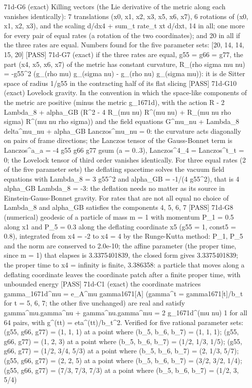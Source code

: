 \documentclass[
  10pt,
]{article}
\newenvironment{Shaded}{}{}
\newcommand{\NormalTok}[1]{#1}
\begin{document}
\begin{Shaded}
\begin{Highlighting}[]
\NormalTok{[PASS] 71d{-}G6  (exact) Killing vectors (the Lie derivative of the metric along each vanishes identically): 7 translations (x0, x1, x2, x3, x5, x6, x7), 6 rotations of (x0, x1, x2, x3), and the scaling d/dx4 + sum\_t rate\_t xt d/dxt, 14 in all; one more for every pair of equal rates (a rotation of the two coordinates); and 20 in all if the three rates are equal. Numbers found for the five parameter sets: [20, 14, 14, 15, 20]}
\NormalTok{[PASS] 71d{-}G7  (exact) if the three rates are equal, g55 = g66 = g77, the part (x4, x5, x6, x7) of the metric has constant curvature, R\_(rho sigma mu nu) = {-}g55\^{}2 (g\_(rho mu) g\_(sigma nu) {-} g\_(rho nu) g\_(sigma mu)): it is de Sitter space of radius 1/g55 in the contracting half of its flat slicing}
\NormalTok{[PASS] 71d{-}G10  (exact) Lovelock gravity. In the convention in which the space{-}like components of the metric are positive (minus the metric g\_1671d), with the action R {-} 2 Lambda\_8 + alpha\_GB (R\^{}2 {-} 4 R\_(mu nu) R\^{}(mu nu) + R\_(mu nu rho sigma) R\^{}(mu nu rho sigma)) and the field equations G\^{}mu\_nu + Lambda\_8 delta\^{}mu\_nu + alpha\_GB Lanczos\^{}mu\_nu = 0: the curvature acts diagonally on pairs of frame directions; the Lanczos tensor of the Gauss{-}Bonnet term is Lanczos\^{}a\_a = {-}4 g55 g66 g77 gsum (a = 0..3), Lanczos\^{}4\_4 = Lanczos\^{}t\_t = 0; the Lovelock tensor of third order vanishes identically. For three equal rates (2 of the five parameter sets) the deflating spacetime solves the vacuum field equations with Lambda\_8 = 3 g55\^{}2 and alpha\_GB = {-}1/(4 g55\^{}2), that is 4 alpha\_GB Lambda\_8 = {-}3: the deflation needs no matter as its source in Einstein{-}Gauss{-}Bonnet gravity. For rates that are not all equal no choice of Lambda\_8 and alpha\_GB satisfies the components 4, 5, 6, 7}
\NormalTok{[PASS] 71d{-}G8  (numerical) geodesic of a particle of mass m = 1 with momentum P\_1 = 0.5 along x1 and P\_5 = 0.3 along the deflating coordinate x5 (g55 = 1, const5 = 0.8), integrated from x4 = {-}2 to x4 = 4 by the Runge{-}Kutta method: P\_1, P\_5 and the norm are conserved to 2.0e{-}10; the affine parameter (the proper time, since m = 1) that elapses is 3.3375401839, the closed form gives 3.3375401839; the proper time to x4 = infinity is finite, 3.386358: a particle that moves along a deflating coordinate leaves the coordinate patch after a finite proper time, with unbounded energy}
\NormalTok{[PASS] 71d{-}C1  (exact) the coordinate matrices gamma\_1671d\^{}mu = e\_A\^{}mu gamma1671[A] (gamma\^{}t = gamma1671[t]/b\_t for t = 5, 6, 7; the other five unchanged) are real and satisfy gamma\^{}mu.gamma\^{}nu + gamma\^{}nu.gamma\^{}mu = 2 g\_1671d\^{}(mu nu) 1 for all 64 pairs, with g\^{}(tt) = eta\^{}(tt)/b\_t\^{}2. Verified for five rational parameter sets: (g55, g66, g77) = (1, 1, 1) at a point where (b\_5, b\_6, b\_7) = (1, 1, 1); (g55, g66, g77) = (1, 2, 3) at a point where (b\_5, b\_6, b\_7) = (1/2, 1/3, 1/5); (g55, g66, g77) = (1/2, 3/4, 5/3) at a point where (b\_5, b\_6, b\_7) = (2, 1/3, 5/7); (g55, g66, g77) = (2, 2, 5) at a point where (b\_5, b\_6, b\_7) = (3/2, 3/2, 1/4); (g55, g66, g77) = (7/3, 7/3, 7/3) at a point where (b\_5, b\_6, b\_7) = (1/2, 3, 5/4)}

\end{Highlighting}
\end{Shaded}
\end{document}
